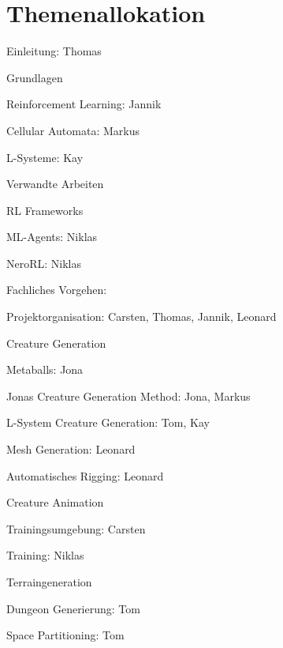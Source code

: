 \chapter*{Themenallokation}

\begin{thallok}
	\item Einleitung: Thomas
	\item Grundlagen
	\begin{thallok}
		\item Reinforcement Learning: Jannik
		\item Cellular Automata: Markus
		\item L-Systeme: Kay
	\end{thallok}
	\item Verwandte Arbeiten
	\begin{thallok}
		\item RL Frameworks
		\begin{thallok}
			\item ML-Agents: Niklas
			\item NeroRL: Niklas
		\end{thallok}
	\end{thallok}
	\item Fachliches Vorgehen:
	\begin{thallok}
		\item Projektorganisation: Carsten, Thomas, Jannik, Leonard
		\item Creature Generation
		\begin{thallok}
			\item Metaballs: Jona
			\item Jonas Creature Generation Method: Jona, Markus
			\item L-System Creature Generation: Tom, Kay
			\item Mesh Generation: Leonard
			\item Automatisches Rigging: Leonard
		\end{thallok}
		\item Creature Animation
		\begin{thallok}
			\item Trainingsumgebung: Carsten
			\item Training: Niklas
		\end{thallok}
		\item Terraingeneration
		\begin{thallok}
			\item Dungeon Generierung: Tom
			\item Space Partitioning: Tom

\end{thallok}
\end{thallok}
\end{thallok}
